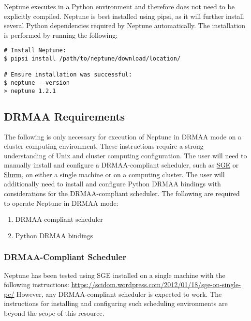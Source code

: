 \documentclass[a4paper,10pt]{article}
\begin{document}
Neptune executes in a Python environment and therefore does not need to be explicitly compiled. Neptune is best installed using pipsi, as it will further install several Python dependencies required by Neptune automatically. The installation is performed by running the following:

\begin{lstlisting}
# Install Neptune:
$ pipsi install /path/to/neptune/download/location/

# Ensure installation was successful:
$ neptune --version
> neptune 1.2.1
\end{lstlisting}

\newpage
\subsection{DRMAA Requirements}

The following is only necessary for execution of Neptune in DRMAA mode on a cluster computing environment. These instructions require a strong understanding of Unix and cluster computing configuration. The user will need to manually install and configure a DRMAA-compliant scheduler, such as \href{http://gridscheduler.sourceforge.net/}{SGE} or \href{http://slurm.schedmd.com/}{Slurm}, on either a single machine or on a computing cluster. The user will additionally need to install and configure Python DRMAA bindings with considerations for the DRMAA-compliant scheduler. The following are required to operate Neptune in DRMAA mode:

\begin{enumerate}
  \item DRMAA-compliant scheduler
  \item Python DRMAA bindings
\end{enumerate}

\subsubsection{DRMAA-Compliant Scheduler}

Neptune has been tested using SGE installed on a single machine with the following instructions:
\newline\newline
\url{https://scidom.wordpress.com/2012/01/18/sge-on-single-pc/}
\newline\newline
However, any DRMAA-compliant scheduler is expected to work. The instructions for installing and configuring such scheduling environments are beyond the scope of this resource.
\end{document}
